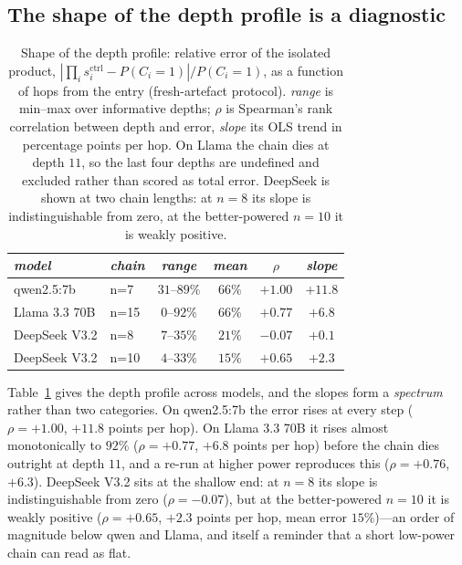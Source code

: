 \documentclass[sigconf,anonymous]{aamas}
\newcommand{\scite}[1]{\ensuremath{s^{\mathrm{ctrl}}_{#1}}}
\begin{document}
\subsection{The shape of the depth profile is a diagnostic}
\label{sec:depth}

\begin{table}[t]
\small
\caption{Shape of the depth profile: relative error of the isolated product,
$|\prod_i \scite{i} - P(C_i{=}1)| / P(C_i{=}1)$, as a function of hops from the
entry (fresh-artefact protocol). \emph{range} is min--max over informative depths;
$\rho$ is Spearman's rank correlation between depth and error, \emph{slope} its OLS
trend in percentage points per hop. On Llama the chain dies at depth $11$, so the
last four depths are undefined and excluded rather than scored as total error.
DeepSeek is shown at two chain lengths: at $n=8$ its slope is indistinguishable from
zero, at the better-powered $n=10$ it is weakly positive.}
\label{tab:depth}
\begin{tabular}{llcccc}
\toprule
\textit{model} & \textit{chain} & \textit{range} & \textit{mean} & \textit{$\rho$}
& \textit{slope} \\
\midrule
qwen2.5:7b     & n=7  & $31$--$89\%$ & $66\%$ & $+1.00$ & $+11.8$ \\
Llama 3.3 70B  & n=15 & $0$--$92\%$  & $66\%$ & $+0.77$ & $+6.8$  \\
DeepSeek V3.2  & n=8  & $7$--$35\%$  & $21\%$ & $-0.07$ & $+0.1$  \\
DeepSeek V3.2  & n=10 & $4$--$33\%$  & $15\%$ & $+0.65$ & $+2.3$  \\
\bottomrule
\end{tabular}
\end{table}

Table~\ref{tab:depth} gives the depth profile across models, and the slopes form a
\emph{spectrum} rather than two categories. On qwen2.5:7b the error rises at every
step ($\rho = +1.00$, $+11.8$ points per hop). On Llama 3.3 70B it rises almost
monotonically to $92\%$ ($\rho = +0.77$, $+6.8$ points per hop) before the chain
dies outright at depth $11$, and a re-run at higher power reproduces this
($\rho = +0.76$, $+6.3$). DeepSeek V3.2 sits at the shallow end: at $n=8$ its slope is
indistinguishable from zero ($\rho = -0.07$), but at the better-powered $n=10$ it is
weakly positive ($\rho = +0.65$, $+2.3$ points per hop, mean error $15\%$)---an order
of magnitude below qwen and Llama, and itself a reminder that a short low-power chain
can read as flat.
\end{document}
